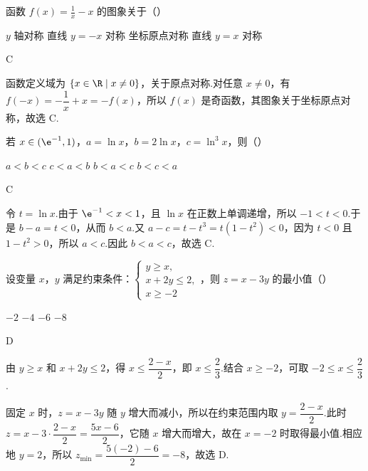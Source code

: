 \begin{problem}
函数 \( f(x) = \frac{1}{x} - x \) 的图象关于（\quad）

\choices
    {\(y\) 轴对称}
    {直线 \(y = -x\) 对称}
    {坐标原点对称}
    {直线 \( y = x \) 对称}
\end{problem}

\begin{answer}
C
\end{answer}

\begin{solution}
函数定义域为 \(\{x\in\R\mid x\ne0\}\)，关于原点对称.对任意 \(x\ne0\)，有
\(f(-x)=-\dfrac{1}{x}+x=-f(x)\)，所以 \(f(x)\) 是奇函数，其图象关于坐标原点对称，故选 C.
\end{solution}

\begin{problem}
若 \(x \in (\e^{-1}, 1)\)，\(a = \ln x\)，\(b = 2 \ln x\)，\(c = \ln^3 x\)，则（\quad）

\choices
    {\(a < b < c\)}
    {\(c < a < b\)}
    {\(b < a < c\)}
    {\(b < c < a\)}
\end{problem}

\begin{answer}
C
\end{answer}

\begin{solution}
令 \(t=\ln x\).由于 \(\e^{-1}<x<1\)，且 \(\ln x\) 在正数上单调递增，所以 \(-1<t<0\).于是 \(b-a=t<0\)，从而 \(b<a\).又
\(a-c=t-t^3=t(1-t^2)<0\)，因为 \(t<0\) 且 \(1-t^2>0\)，所以 \(a<c\).因此 \(b<a<c\)，故选 C.
\end{solution}

\begin{problem}
设变量 \(x\)，\(y\) 满足约束条件：\(\begin{cases}
y \geqslant x,\\
x + 2y \leqslant 2,\\
x \geqslant -2
\end{cases}\)，则 \(z = x - 3y\) 的最小值（\quad）

\choices
    {\(-2\)}
    {\(-4\)}
    {\(-6\)}
    {\(-8\)}
\end{problem}

\begin{answer}
D
\end{answer}

\begin{solution}
由 \(y\geqslant x\) 和 \(x+2y\leqslant2\)，得 \(x\leqslant\dfrac{2-x}{2}\)，即 \(x\leqslant\dfrac23\).结合 \(x\geqslant-2\)，可取 \(-2\leqslant x\leqslant\dfrac23\).

固定 \(x\) 时，\(z=x-3y\) 随 \(y\) 增大而减小，所以在约束范围内取 \(y=\dfrac{2-x}{2}\).此时
\(z=x-3\cdot\dfrac{2-x}{2}=\dfrac{5x-6}{2}\)，它随 \(x\) 增大而增大，故在 \(x=-2\) 时取得最小值.相应地 \(y=2\)，所以 \(z_{\min}=\dfrac{5(-2)-6}{2}=-8\)，故选 D.
\end{solution}

